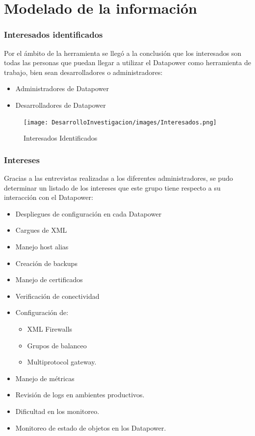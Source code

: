 \section{Modelado de la información}
\subsubsection{Interesados identificados}
Por el ámbito de la herramienta se llegó a la conclusión que los interesados son todas las personas que puedan llegar a utilizar el Datapower como herramienta de trabajo, bien sean desarrolladores o administradores:
\begin{itemize}
    \item Administradores de Datapower
    \item Desarrolladores de Datapower
\end{itemize}
\begin{figure}[th!]
    \centering
    \texttt{[image: DesarrolloInvestigacion/images/Interesados.png]}
    \caption{Interesados Identificados}
\end{figure}
\subsubsection{Intereses}
Gracias a las entrevistas realizadas a los diferentes administradores, se pudo determinar un listado de los intereses que este grupo tiene respecto a su interacción con el Datapower:
\begin{itemize}
    \item Despliegues de configuración en cada Datapower
    \item Cargues de XML
    \item Manejo host alias
    \item Creación de backups
    \item Manejo de certificados
    \item Verificación de conectividad
    \item Configuración de:
    \begin{itemize}
        \item XML Firewalls
        \item Grupos de balanceo
        \item Multiprotocol gateway.
    \end{itemize}
    \item Manejo de métricas
    \item Revisión de logs en ambientes productivos.
    \item Dificultad en los monitoreo.
    \item Monitoreo de estado de objetos en los Datapower.
\end{itemize}
